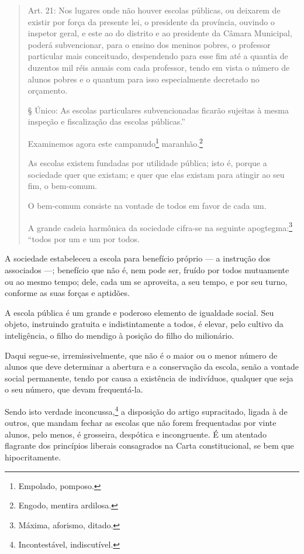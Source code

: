 \begin{quote}
Art. 21: Nos lugares onde não houver escolas públicas, ou deixarem de
existir por força da presente lei, o presidente da província, ouvindo o
inspetor geral, e este ao do distrito e ao presidente da Câmara
Municipal, poderá subvencionar, para o ensino dos meninos pobres, o
professor particular mais conceituado, despendendo para esse fim até a
quantia de duzentos mil réis anuais com cada professor, tendo em vista o
número de alunos pobres e o quantum para isso especialmente decretado no
orçamento.

§ Único: As escolas particulares subvencionadas ficarão sujeitas à mesma
inspeção e fiscalização das escolas públicas.''

Examinemos agora este campanudo\footnote{Empolado, pomposo.}
maranhão.\footnote{Engodo, mentira ardilosa.}

As escolas existem fundadas por utilidade pública; isto é, porque a
sociedade quer que existam; e quer que elas existam para atingir ao seu
fim, o bem-comum.

O bem-comum consiste na vontade de todos em favor de cada um.

A grande cadeia harmônica da sociedade cifra-se na seguinte
apogtegma:\footnote{Máxima, aforismo, ditado.} ``todos por um e um por
todos.
\end{quote}

A sociedade estabeleceu a escola para benefício próprio --- a instrução
dos associados ---; benefício que não é, nem pode ser, fruído por todos
mutuamente ou ao mesmo tempo; dele, cada um se aproveita, a seu tempo, e
por seu turno, conforme as suas forças e aptidões.

A escola pública é um grande e poderoso elemento de igualdade social.
Seu objeto, instruindo gratuita e indistintamente a todos, é elevar,
pelo cultivo da inteligência, o filho do mendigo à posição do filho do
milionário.

Daqui segue-se, irremissivelmente, que não é o maior ou o menor número
de alunos que deve determinar a abertura e a conservação da escola,
senão a vontade social permanente, tendo por causa a existência de
indivíduos, qualquer que seja o seu número, que devam frequentá-la.

Sendo isto verdade inconcussa,\footnote{Incontestável, indiscutível.}
a disposição do artigo supracitado, ligada à de outros, que mandam
fechar as escolas que não forem frequentadas por vinte alunos, pelo
menos, é grosseira, despótica e incongruente. É um atentado flagrante
dos princípios liberais consagrados na Carta constitucional, se bem que
hipocritamente.

